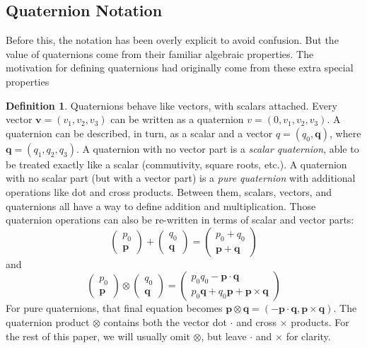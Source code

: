 \documentclass{amsart}
\theoremstyle{definition}
\newtheorem{definition}[theorem]{Definition}
\theoremstyle{remark}
\numberwithin{equation}{section}
\begin{document}
\subsection{Quaternion Notation}
Before this, the notation has been overly explicit to avoid confusion. But the value of quaternions come from their familiar algebraic properties. The motivation for defining quaternions had originally come from these extra special properties
\begin{definition}
  Quaternions behave like vectors, with scalars attached. Every vector $\mathbf{v} = \left(v_1, v_2, v_3\right)$ can be written as a quaternion $v = \left(0, v_1, v_2, v_3\right)$. A quaternion can be described, in turn, as a scalar and a vector $q = \left(q_0, \mathbf{q}\right)$, where $\mathbf{q} = \left(q_1, q_2, q_3\right)$. A quaternion with no vector part is a \emph{scalar quaternion}, able to be treated exactly like a scalar (commutivity, square roots, etc.). A quaternion with no scalar part (but with a vector part) is a \emph{pure quaternion} with additional operations like dot and cross products. Between them, scalars, vectors, and quaternions all have a way to define addition and multiplication. Those quaternion operations can also be re-written in terms of scalar and vector parts:
  \begin{equation}
    \begin{pmatrix}
      p_0 \\
      \mathbf{p}
    \end{pmatrix}
    +
    \begin{pmatrix}
      q_0 \\
      \mathbf{q}
    \end{pmatrix}
    =
    \begin{pmatrix}
      p_0+q_0 \\
      \mathbf{p} + \mathbf{q}
    \end{pmatrix}
  \end{equation}
  and
  \begin{equation}
    \begin{pmatrix}
      p_0 \\
      \mathbf{p}
    \end{pmatrix}
    \otimes
    \begin{pmatrix}
      q_0 \\
      \mathbf{q}
    \end{pmatrix}
    =
    \begin{pmatrix}
      p_0q_0 - \mathbf{p}\cdot \mathbf{q} \\
      p_0\mathbf{q} + q_0\mathbf{p} + \mathbf{p}\times \mathbf{q}
    \end{pmatrix}
  \end{equation}
  For pure quaternions, that final equation becomes
  $\mathbf{p}\otimes\mathbf{q} = \left( -\mathbf{p}\cdot \mathbf{q}, \mathbf{p} \times \mathbf{q}\right)$.
  The quaternion product $\otimes$ contains both the vector dot $\cdot$ and cross $\times$ products. For the rest of this paper, we will usually omit $\otimes$, but leave $\cdot$ and $\times$ for clarity.
\end{definition}
\end{document}
